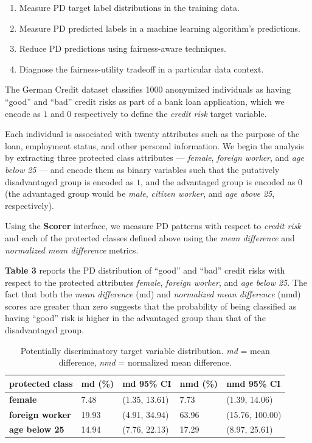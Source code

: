 \documentclass{interact}
\begin{document}
\begin{enumerate}
  \item Measure PD target label distributions in the training data.
  \item Measure PD predicted labels in a machine learning algorithm's predictions.
  \item Reduce PD predictions using fairness-aware techniques.
  \item Diagnose the fairness-utility tradeoff in a particular data context.
\end{enumerate}

The German Credit dataset classifies 1000 anonymized individuals as having
``good'' and ``bad'' credit risks as part of a bank loan application, which we
encode as \(1\) and \(0\) respectively to define the \emph{credit risk}
target variable.

Each individual is associated with twenty attributes such as the purpose of the
loan, employment status, and other personal information. We begin the analysis
by extracting three protected class attributes --- \emph{female},
\emph{foreign worker}, and \emph{age below 25} --- and encode them as binary
variables such that the putatively disadvantaged group is encoded as \(1\), and
the advantaged group is encoded as \(0\) (the advantaged group would be
\emph{male}, \emph{citizen worker}, and \emph{age above 25}, respectively).

Using the \textbf{Scorer} interface, we measure PD patterns with respect to
\emph{credit risk} and each of the protected classes defined above using the
\emph{mean difference} and \emph{normalized mean difference} metrics.

\textbf{Table 3} reports the PD distribution of ``good'' and ``bad'' credit
risks with respect to the protected attributes \emph{female}, \emph{foreign
worker}, and \emph{age below 25}. The fact that both the \emph{mean difference}
(md) and \emph{normalized mean difference} (nmd) scores are greater than zero
suggests that the probability of being classified as having ``good'' risk is
higher in the advantaged group than that of the disadvantaged group.

\begin{table}
  \caption{Potentially discriminatory target variable distribution.
    \emph{md} = mean difference, \emph{nmd} = normalized mean difference.}
  \renewcommand{\arraystretch}{1.75}
  \small\noindent\begin{tabularx}{\linewidth}{l|X|X|X|X}
    \textbf{protected class} & \textbf{md (\%)} & \textbf{md 95\% CI} &
      \textbf{nmd (\%)} & \textbf{nmd 95\% CI}\\
    \hline
    \textbf{female} & 7.48 & (1.35, 13.61) & 7.73 & (1.39, 14.06) \\
    \textbf{foreign worker} & 19.93 & (4.91, 34.94) & 63.96 & (15.76, 100.00)\\
    \textbf{age below 25} & 14.94 & (7.76, 22.13) & 17.29 & (8.97, 25.61)\\
  \end{tabularx}
\end{table}
\end{document}
